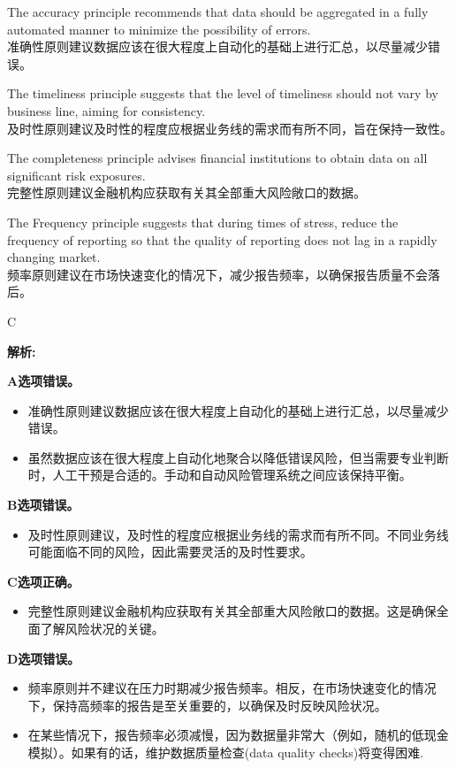 \documentclass{article}
\newenvironment{explanation}
{\textbf{解析:}\par}
{\par}
\begin{document}
\begin{choices}
\item The accuracy principle recommends that data should be aggregated in a fully automated manner to minimize the possibility of errors.  \\
准确性原则建议数据应该在很大程度上自动化的基础上进行汇总，以尽量减少错误。
\item The timeliness principle suggests that the level of timeliness should not vary by business line, aiming for consistency.  \\
及时性原则建议及时性的程度应根据业务线的需求而有所不同，旨在保持一致性。
\item The completeness principle advises financial institutions to obtain data on all significant risk exposures.  \\
完整性原则建议金融机构应获取有关其全部重大风险敞口的数据。
\item The Frequency principle suggests that during times of stress, reduce the frequency of reporting so that the quality of reporting does not lag in a rapidly changing market. \\
频率原则建议在市场快速变化的情况下，减少报告频率，以确保报告质量不会落后。
\end{choices}

\begin{correctanswer}
    C
\end{correctanswer}

\begin{explanation}
    \textbf{A选项错误。}
    \begin{itemize}
        \item 准确性原则建议数据应该在很大程度上自动化的基础上进行汇总，以尽量减少错误。
        \item 虽然数据应该在很⼤程度上⾃动化地聚合以降低错误风险，但当需要专业判断时，⼈⼯⼲预是合适的。⼿动和⾃动风险管理系统之间应该保持平衡。
    \end{itemize}
    
    \textbf{B选项错误。}
    \begin{itemize}
        \item 及时性原则建议，及时性的程度应根据业务线的需求而有所不同。不同业务线可能面临不同的风险，因此需要灵活的及时性要求。
    \end{itemize}
    
    \textbf{C选项正确。}
    \begin{itemize}
        \item 完整性原则建议金融机构应获取有关其全部重大风险敞口的数据。这是确保全面了解风险状况的关键。
    \end{itemize}
    
    \textbf{D选项错误。}
    \begin{itemize}
        \item 频率原则并不建议在压力时期减少报告频率。相反，在市场快速变化的情况下，保持高频率的报告是至关重要的，以确保及时反映风险状况。
        \item 在某些情况下，报告频率必须减慢，因为数据量非常大（例如，随机的低现金模拟）。如果有的话，维护数据质量检查(data quality checks)将变得困难.
    \end{itemize}
\end{explanation}
\end{document}

